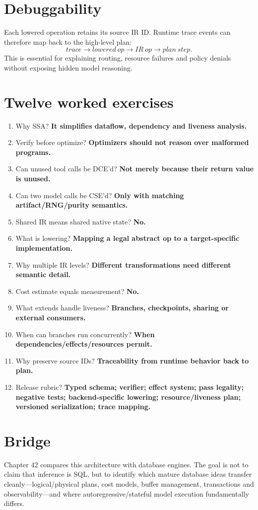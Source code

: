 \section{Debuggability}
Each lowered operation retains its source IR ID. Runtime trace events can therefore map back to the high-level plan:
\[
trace\rightarrow lowered\ op\rightarrow IR\ op\rightarrow plan\ step.
\]
This is essential for explaining routing, resource failures and policy denials without exposing hidden model reasoning.

\section{Twelve worked exercises}
\begin{enumerate}
\item Why SSA? \textbf{It simplifies dataflow, dependency and liveness analysis.}
\item Verify before optimize? \textbf{Optimizers should not reason over malformed programs.}
\item Can unused tool calls be DCE'd? \textbf{Not merely because their return value is unused.}
\item Can two model calls be CSE'd? \textbf{Only with matching artifact/RNG/purity semantics.}
\item Shared IR means shared native state? \textbf{No.}
\item What is lowering? \textbf{Mapping a legal abstract op to a target-specific implementation.}
\item Why multiple IR levels? \textbf{Different transformations need different semantic detail.}
\item Cost estimate equals measurement? \textbf{No.}
\item What extends handle liveness? \textbf{Branches, checkpoints, sharing or external consumers.}
\item When can branches run concurrently? \textbf{When dependencies/effects/resources permit.}
\item Why preserve source IDs? \textbf{Traceability from runtime behavior back to plan.}
\item Release rubric? \textbf{Typed schema; verifier; effect system; pass legality; negative tests; backend-specific lowering; resource/liveness plan; versioned serialization; trace mapping.}
\end{enumerate}

\section{Bridge}
Chapter 42 compares this architecture with database engines. The goal is not to claim that inference is SQL, but to identify which mature database ideas transfer cleanly---logical/physical plans, cost models, buffer management, transactions and observability---and where autoregressive/stateful model execution fundamentally differs.
